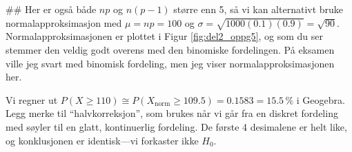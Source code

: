 \begin{easylist}[enumerate]
	## Her er også både $np$ og $n(p-1)$ større enn 5, så vi kan alternativt bruke
	normalapproksimasjon med $\mu =np=100$ og $\sigma = \sqrt{1000 (0.1) (0.9)} = \sqrt{90}$. Normalapproksimasjonen er plottet i Figur \ref{fig:del2_oppg5}, og som du ser stemmer den veldig godt overens
	med den binomiske fordelingen.
	På eksamen ville jeg svart med binomisk fordeling, men jeg viser normalapproksimasjonen her.
	
	Vi regner ut $P(X \geq 110) \cong P(X_\text{norm} \geq 109.5) = 0.1583 = 15.5\,  \%$ i Geogebra. Legg merke til ``halvkorreksjon'', som brukes når vi går fra en diskret fordeling med søyler til en glatt, kontinuerlig fordeling. De første 4 desimalene er helt like, og konklusjonen er identisk---vi forkaster ikke $H_0$.
	
\end{easylist}

